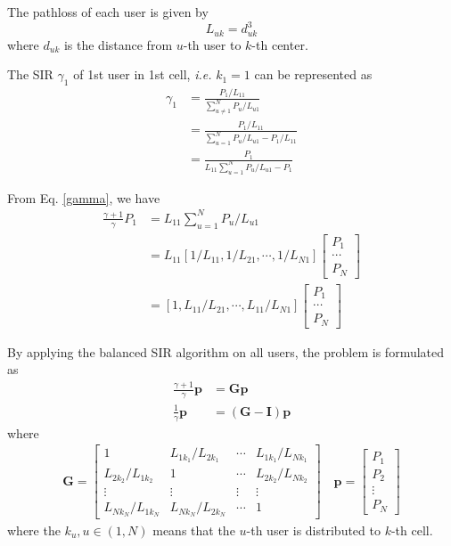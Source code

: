 \documentclass[12pt]{article}
\begin{document}
The pathloss of each user is given by
\begin{equation}
L_{uk} = d_{uk}^3
\end{equation}
where $d_{uk}$ is the distance from $u$-th user to $k$-th center.

The SIR $\gamma_1$ of 1st user in 1st cell, \textit{i.e.} $k_1=1$ can be represented as
\begin{align}\label{gamma}
	\gamma_1 &= \frac{P_1/L_{11}}{\sum_{u\neq 1}^{N}P_{u}/L_{u1}} \nonumber\\
	&= \frac{P_1/L_{11}}{\sum_{u=1}^{N}P_{u}/L_{u1} - P_1/L_{11}} \nonumber\\
	&= \frac{P_1}{L_{11}\sum_{u=1}^{N}P_{u}/L_{u1} - P_1} 
\end{align}

From Eq. \eqref{gamma}, we have
\begin{align}
\frac{\gamma+1}{\gamma}P_1 &= L_{11}\sum_{u=1}^{N}P_{u}/L_{u1} \\
& = L_{11} 
[1/L_{11}, 1/L_{21},\cdots, 1/L_{N1}]
\begin{bmatrix}
P_{1}\\
\cdots \\
P_{N}
\end{bmatrix}\\
&=[1, L_{11}/L_{21},\cdots, L_{11}/L_{N1}]
\begin{bmatrix}
P_{1}\\
\cdots \\
P_{N}
\end{bmatrix}
\end{align}

By applying the balanced SIR algorithm on all users, the problem is formulated as
\begin{align}
\frac{\gamma+1}{\gamma}\bm{p} &= \bm{G}\bm{p}\\
\frac{1}{\gamma}\bm{p} &= (\bm{G}-\bm{I})\bm{p}
\end{align}
where 
\begin{align}
\bm{G} = 
\begin{bmatrix}
1& L_{1k_1}/L_{2k_1}&\cdots& L_{1k_1}/L_{Nk_1}\\
L_{2k_2}/L_{1k_2}& 1&\cdots& L_{2k_2}/L_{Nk_2}\\
\vdots&\vdots&\vdots&\vdots\\
L_{Nk_N}/L_{1k_N}& L_{Nk_N}/L_{2k_N}&\cdots& 1
\end{bmatrix}
\quad
\bm{p} =
\begin{bmatrix}
P_{1}\\
P_{2}\\
\vdots\\
P_N
\end{bmatrix}
\end{align}
where the $k_u,u\in (1, N)$ means that the $u$-th user is distributed to $k$-th cell.
\end{document}
